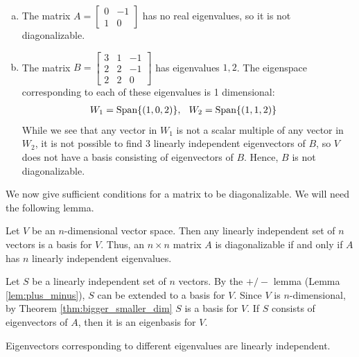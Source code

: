 \documentclass[12pt,letterpaper,reqno]{article}
\numberwithin{equation}{section}
\begin{document}
\begin{example}
\begin{enumerate}[(a)]
	\item The matrix $A=\begin{bmatrix}
		0 & -1 \\
		1 & 0
	\end{bmatrix}$ has no real eigenvalues, so it is not diagonalizable.
	\item The matrix $B=\begin{bmatrix}
			3 & 1 & -1 \\
			2 & 2 & -1 \\
			2 & 2 & 0
		\end{bmatrix}$ has eigenvalues $1, 2$. The eigenspace corresponding to each of these eigenvalues is 1 dimensional:
	\begin{align*}
		W_1=\text{Span}\{(1,0,2)\}, \hspace{0.25cm} W_2&=\text{Span}\{(1,1,2)\}
	\end{align*}
While we see that any vector in $W_1$ is not a scalar multiple of any vector in $W_2$, it is not possible to find 3 linearly independent eigenvectors of $B$, so $V$ does not have a basis consisting of eigenvectors of $B$. Hence, $B$ is not diagonalizable. 
\end{enumerate}	
\end{example}
We now give sufficient conditions for a matrix to be diagonalizable. We will need the following lemma.

\begin{lem}
Let $V$ be an $n$-dimensional vector space. Then any linearly independent set of $n$ vectors is a basis for $V$. Thus, an $n \times n$ matrix $A$ is diagonalizable if and only if $A$ has $n$ linearly independent eigenvalues.	
\end{lem}

\begin{pf}
Let $S$ be a linearly independent set of $n$ vectors. By the $+/-$ lemma (Lemma \ref{lem:plus_minus}), $S$ can be extended to a basis for $V$. Since $V$ is $n$-dimensional, by Theorem \ref{thm:bigger_smaller_dim} $S$ is a basis for $V$. If $S$ consists of eigenvectors of $A$, then it is an eigenbasis for $V$.
\end{pf}


\begin{thm}
	Eigenvectors corresponding to different eigenvalues are linearly independent.
\end{thm}
\end{document}

